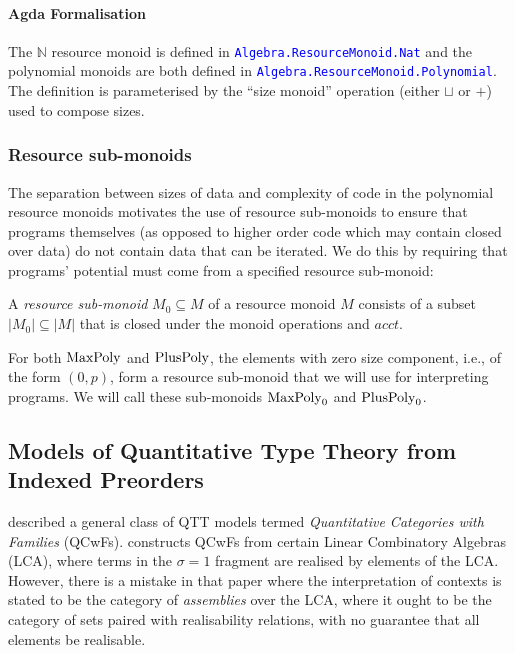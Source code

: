 \documentclass[acmsmall,screen]{acmart}
\newcommand{\AgdaModule}[1]{\textcolor{blue}{\tt #1}}
\begin{document}
\paragraph{Agda Formalisation} The $\mathbb{N}$ resource monoid is
defined in \AgdaModule{Algebra.ResourceMonoid.Nat} and the polynomial
monoids are both defined in
\AgdaModule{Algebra.ResourceMonoid.Polynomial}. The definition is
parameterised by the ``size monoid'' operation (either $\sqcup$ or
$+$) used to compose sizes.


\subsubsection{Resource sub-monoids}

The separation between sizes of data and complexity of code in the
polynomial resource monoids motivates the use of resource sub-monoids
to ensure that programs themselves (as opposed to higher order code
which may contain closed over data) do not contain data that can be
iterated. We do this by requiring that programs' potential must come
from a specified resource sub-monoid:

\begin{definition}
  A \emph{resource sub-monoid} $M_0 \subseteq M$ of a resource monoid
  $M$ consists of a subset $|M_0| \subseteq |M|$ that is closed under
  the monoid operations and $\mathit{acct}$.
\end{definition}

For both $\mathrm{MaxPoly}$ and $\mathrm{PlusPoly}$, the elements with zero size
component, i.e., of the form $(0,p)$, form a resource sub-monoid that
we will use for interpreting programs. We will call these sub-monoids
$\mathrm{MaxPoly}_0$ and $\mathrm{PlusPoly}_0$.

\subsection{Models of Quantitative Type Theory from Indexed Preorders}
\label{sec:qtt-models}

\citet{atkey18qtt} described a general class of QTT models termed
\emph{Quantitative Categories with Families}
(QCwFs). \citet{atkey18qtt} constructs QCwFs from certain Linear
Combinatory Algebras (LCA), where terms in the $\sigma = 1$ fragment
are realised by elements of the LCA. However, there is a mistake in
that paper where the interpretation of contexts is stated to be the
category of \emph{assemblies} over the LCA, where it ought to be the
category of sets paired with realisability relations, with no
guarantee that all elements be realisable.
\end{document}
